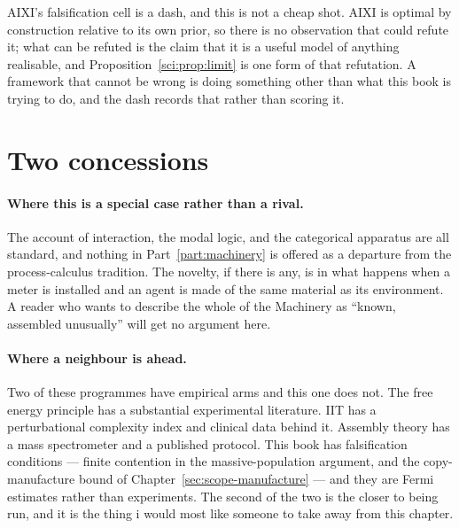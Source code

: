 AIXI's falsification cell is a dash, and this is not a cheap shot.
AIXI is optimal by construction relative to its own prior, so there
is no observation that could refute it; what can be refuted is the
claim that it is a useful model of anything realisable, and
Proposition~\ref{sci:prop:limit} is one form of that refutation.
A framework that cannot be wrong is doing something other than what
this book is trying to do, and the dash records that rather than
scoring it.

\section*{Two concessions}

\paragraph{Where this is a special case rather than a rival.}
The account of interaction, the modal logic, and the categorical
apparatus are all standard, and nothing in
Part~\ref{part:machinery} is offered as a departure from the
process-calculus tradition.
The novelty, if there is any, is in what happens when a meter is
installed and an agent is made of the same material as its
environment.
A reader who wants to describe the whole of the Machinery as
``known, assembled unusually'' will get no argument here.

\paragraph{Where a neighbour is ahead.}
Two of these programmes have empirical arms and this one does not.
The free energy principle has a substantial experimental
literature.
IIT has a perturbational complexity index and clinical data behind
it.
Assembly theory has a mass spectrometer and a published protocol.
This book has falsification conditions --- finite contention in the
massive-population argument, and the copy-manufacture bound of
Chapter~\ref{sec:scope-manufacture} --- and they are Fermi
estimates rather than experiments.
The second of the two is the closer to being run, and it is the
thing i would most like someone to take away from this chapter.

\renewcommand{\thetable}{\thechapter.\arabic{table}}\setcounter{table}{0}
